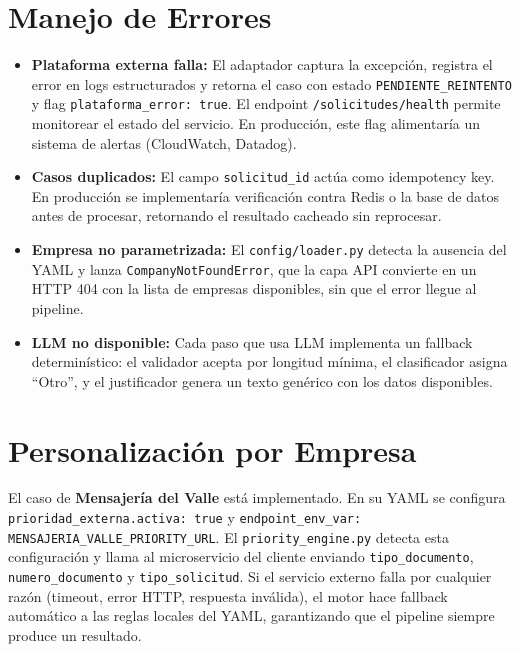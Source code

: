 \documentclass[9pt,letterpaper]{article}
\begin{document}
\section{Manejo de Errores}

\begin{itemize}[leftmargin=*, itemsep=1pt]
  \item \textbf{Plataforma externa falla:} El adaptador captura la excepción, registra el error en logs estructurados y retorna el caso con estado \texttt{PENDIENTE\_REINTENTO} y flag \texttt{plataforma\_error: true}. El endpoint \texttt{/solicitudes/health} permite monitorear el estado del servicio. En producción, este flag alimentaría un sistema de alertas (CloudWatch, Datadog).
  \item \textbf{Casos duplicados:} El campo \texttt{solicitud\_id} actúa como idempotency key. En producción se implementaría verificación contra Redis o la base de datos antes de procesar, retornando el resultado cacheado sin reprocesar.
  \item \textbf{Empresa no parametrizada:} El \texttt{config/loader.py} detecta la ausencia del YAML y lanza \texttt{CompanyNotFoundError}, que la capa API convierte en un HTTP 404 con la lista de empresas disponibles, sin que el error llegue al pipeline.
  \item \textbf{LLM no disponible:} Cada paso que usa LLM implementa un fallback determinístico: el validador acepta por longitud mínima, el clasificador asigna ``Otro'', y el justificador genera un texto genérico con los datos disponibles.
\end{itemize}

\section{Personalización por Empresa}

El caso de \textbf{Mensajería del Valle} está implementado. En su YAML se configura \texttt{prioridad\_externa.activa: true} y \texttt{endpoint\_env\_var: MENSAJERIA\_VALLE\_PRIORITY\_URL}. El \texttt{priority\_engine.py} detecta esta configuración y llama al microservicio del cliente enviando \texttt{tipo\_documento}, \texttt{numero\_documento} y \texttt{tipo\_solicitud}. Si el servicio externo falla por cualquier razón (timeout, error HTTP, respuesta inválida), el motor hace fallback automático a las reglas locales del YAML, garantizando que el pipeline siempre produce un resultado.
\end{document}
